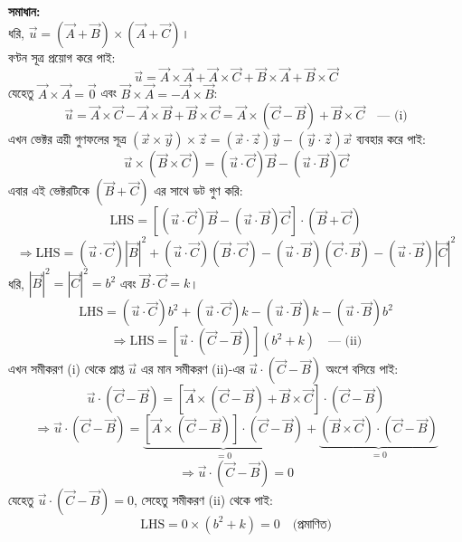 \documentclass[12pt]{article}
\begin{document}
\begin{center}
\end{center}

\textbf{সমাধান:} \\
ধরি, $\vec{u} = (\vec{A}+\vec{B}) \times (\vec{A}+\vec{C})$। \\
বণ্টন সূত্র প্রয়োগ করে পাই:
$$\vec{u} = \vec{A} \times \vec{A} + \vec{A} \times \vec{C} + \vec{B} \times \vec{A} + \vec{B} \times \vec{C}$$
যেহেতু $\vec{A} \times \vec{A} = \vec{0}$ এবং $\vec{B} \times \vec{A} = - \vec{A} \times \vec{B}$:
$$\vec{u} = \vec{A} \times \vec{C} - \vec{A} \times \vec{B} + \vec{B} \times \vec{C} = \vec{A} \times (\vec{C} - \vec{B}) + \vec{B} \times \vec{C} \quad \text{--- (i)}$$
এখন ভেক্টর ত্রয়ী গুণফলের সূত্র $(\vec{x} \times \vec{y}) \times \vec{z} = (\vec{x} \cdot \vec{z})\vec{y} - (\vec{y} \cdot \vec{z})\vec{x}$ ব্যবহার করে পাই:
$$\vec{u} \times (\vec{B} \times \vec{C}) = (\vec{u} \cdot \vec{C})\vec{B} - (\vec{u} \cdot \vec{B})\vec{C}$$
এবার এই ভেক্টরটিকে $(\vec{B}+\vec{C})$ এর সাথে ডট গুণ করি:
$$\text{LHS} = \left[ (\vec{u} \cdot \vec{C})\vec{B} - (\vec{u} \cdot \vec{B})\vec{C} \right] \cdot (\vec{B}+\vec{C})$$
$$\Rightarrow \text{LHS} = (\vec{u} \cdot \vec{C})|\vec{B}|^2 + (\vec{u} \cdot \vec{C})(\vec{B} \cdot \vec{C}) - (\vec{u} \cdot \vec{B})(\vec{C} \cdot \vec{B}) - (\vec{u} \cdot \vec{B})|\vec{C}|^2$$
ধরি, $|\vec{B}|^2 = |\vec{C}|^2 = b^2$ এবং $\vec{B} \cdot \vec{C} = k$।
$$\text{LHS} = (\vec{u} \cdot \vec{C})b^2 + (\vec{u} \cdot \vec{C})k - (\vec{u} \cdot \vec{B})k - (\vec{u} \cdot \vec{B})b^2$$
$$\Rightarrow \text{LHS} = \left[ \vec{u} \cdot (\vec{C} - \vec{B}) \right] (b^2 + k) \quad \text{--- (ii)}$$
এখন সমীকরণ (i) থেকে প্রাপ্ত $\vec{u}$ এর মান সমীকরণ (ii)-এর $\vec{u} \cdot (\vec{C} - \vec{B})$ অংশে বসিয়ে পাই:
$$\vec{u} \cdot (\vec{C} - \vec{B}) = \left[ \vec{A} \times (\vec{C} - \vec{B}) + \vec{B} \times \vec{C} \right] \cdot (\vec{C} - \vec{B})$$
$$\Rightarrow \vec{u} \cdot (\vec{C} - \vec{B}) = \underbrace{[\vec{A} \times (\vec{C} - \vec{B})] \cdot (\vec{C} - \vec{B})}_{=0} + \underbrace{(\vec{B} \times \vec{C}) \cdot (\vec{C} - \vec{B})}_{=0}$$
$$\Rightarrow \vec{u} \cdot (\vec{C} - \vec{B}) = 0$$
যেহেতু $\vec{u} \cdot (\vec{C} - \vec{B}) = 0$, সেহেতু সমীকরণ (ii) থেকে পাই:
$$\text{LHS} = 0 \times (b^2 + k) = 0 \quad \text{(প্রমাণিত)}$$
\end{document}

